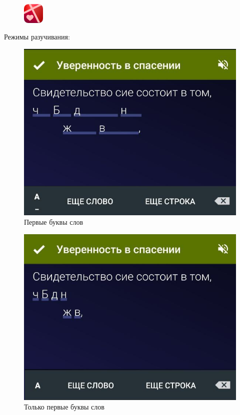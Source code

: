 \documentclass[t,aspectratio=169]{beamer}  %
\begin{document}
\begin{frame}[c]
	\frametitle{\insertsection}
	\framesubtitle{\insertsubsection}
	\begin{figure}
		\begin{flushright}
		\vspace{-1.5cm}
		\includegraphics[width=1cm]{remember-me-logo}
	\end{flushright}
		\end{figure}
		\vspace{0.4cm}
	Режимы разучивания:
	 \begin{multicols}{2}
		\begin{center}
			\begin{figure}
				\includegraphics[height=0.55\textheight]{remember-me-card-hide-letters-underscores}
				\caption{Первые буквы слов}
				\end{figure}		
			\end{center}			
			\begin{figure}
			\includegraphics[height=0.55\textheight]{remember-me-card-hide-letter}
			\caption{Только первые буквы слов}
			\end{figure}


\end{multicols}
\end{frame}
\end{document}

